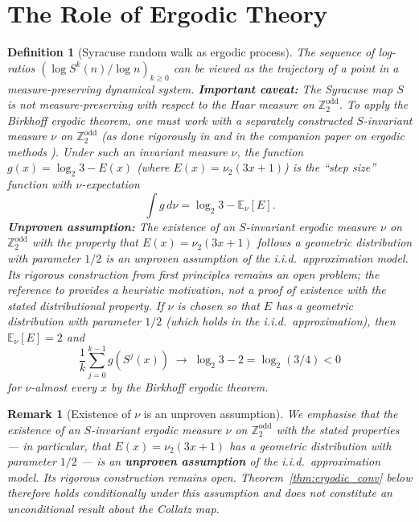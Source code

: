 \documentclass[12pt,a4paper]{article}
\newtheorem{definition}[theorem]{Definition}
\newtheorem{remark}[theorem]{Remark}
\begin{document}
\section{The Role of Ergodic Theory}

\begin{definition}[Syracuse random walk as ergodic process]\label{def:ergodic_rw}
The sequence of log-ratios $(\log S^k(n) / \log n)_{k \geq 0}$ can be viewed as the
trajectory of a point in a measure-preserving dynamical system.
\textbf{Important caveat:} The Syracuse map $S$ is \emph{not} measure-preserving
with respect to the Haar measure on $\mathbb{Z}_2^{\text{odd}}$.
To apply the Birkhoff ergodic theorem, one must work with a separately constructed
$S$-invariant measure $\nu$ on $\mathbb{Z}_2^{\text{odd}}$ (as done rigorously in
\cite{Tao2022} and in the companion paper on ergodic methods \cite{Kontorovich2010}).
Under such an invariant measure $\nu$, the function
$g(x) = \log_2 3 - E(x)$ (where $E(x) = \nu_2(3x+1)$) is the ``step size''
function with $\nu$-expectation
\[
  \int g\, d\nu = \log_2 3 - \mathbb{E}_\nu[E].
\]
\textbf{Unproven assumption:} The existence of an $S$-invariant ergodic measure $\nu$
on $\mathbb{Z}_2^{\text{odd}}$ with the property that $E(x) = \nu_2(3x+1)$ follows a
geometric distribution with parameter $1/2$ is an \emph{unproven assumption} of the
i.i.d.\ approximation model. Its rigorous construction from first principles remains an
open problem; the reference to \cite{Kontorovich2010} provides a heuristic motivation,
not a proof of existence with the stated distributional property.
If $\nu$ is chosen so that $E$ has a geometric distribution with parameter $1/2$
(which holds in the i.i.d.\ approximation), then $\mathbb{E}_\nu[E] = 2$ and
\[
  \frac{1}{k} \sum_{j=0}^{k-1} g(S^j(x)) \;\longrightarrow\; \log_2 3 - 2 = \log_2(3/4) < 0
\]
for $\nu$-almost every $x$ by the Birkhoff ergodic theorem.
\end{definition}

\begin{remark}[Existence of $\nu$ is an unproven assumption]\label{rem:nu_assumption}
We emphasise that the existence of an $S$-invariant ergodic measure $\nu$ on
$\mathbb{Z}_2^{\text{odd}}$ with the stated properties --- in particular, that $E(x)=\nu_2(3x+1)$
has a geometric distribution with parameter $1/2$ --- is an \textbf{unproven assumption}
of the i.i.d.\ approximation model. Its rigorous construction remains open.
Theorem~\ref{thm:ergodic_conv} below therefore holds \emph{conditionally} under this
assumption and does not constitute an unconditional result about the Collatz map.
\end{remark}
\end{document}
